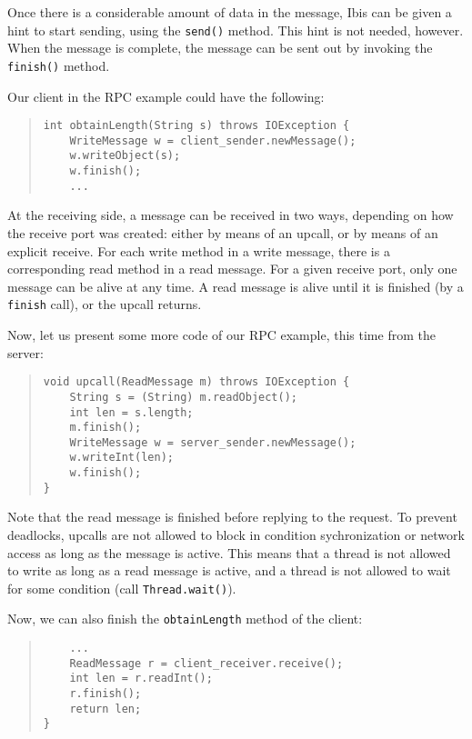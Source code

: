 \documentclass[10pt]{article}
\begin{document}
Once there is a considerable amount of data in the message, Ibis
can be given a hint to start sending, using the \verb+send()+
method. This hint is not needed, however. When the message is
complete, the message can be sent out by invoking the
\verb+finish()+ method.

Our client in the RPC example could have the following:
\begin{quote}
\begin{verbatim}
int obtainLength(String s) throws IOException {
    WriteMessage w = client_sender.newMessage();
    w.writeObject(s);
    w.finish();
    ...
\end{verbatim}
\end{quote}

At the receiving side, a message can be received in two ways,
depending on how the receive port was created: either by means of an
upcall, or by means of an explicit receive. For each write method
in a write message, there is a corresponding read method in
a read message. For a given receive port, only one message can
be alive at any time. A read message is alive until it is
finished (by a \verb+finish+ call), or the upcall returns.

Now, let us present some more code of our RPC example, this time
from the server:

\begin{quote}
\begin{verbatim}
void upcall(ReadMessage m) throws IOException {
    String s = (String) m.readObject();
    int len = s.length;
    m.finish();
    WriteMessage w = server_sender.newMessage();
    w.writeInt(len);
    w.finish();
}
\end{verbatim}
\end{quote}

Note that the read message is finished before replying to the
request. To prevent deadlocks, upcalls are not allowed to block in
condition sychronization or network access as long as the message
is active. This means that a thread is not allowed to write as long
as a read message is active, and a thread is not allowed to wait for
some condition (call \verb+Thread.wait()+).

Now, we can also finish the \verb+obtainLength+ method of the client:
\begin{quote}
\begin{verbatim}
    ...
    ReadMessage r = client_receiver.receive();
    int len = r.readInt();
    r.finish();
    return len;
}
\end{verbatim}
\end{quote}
\end{document}
